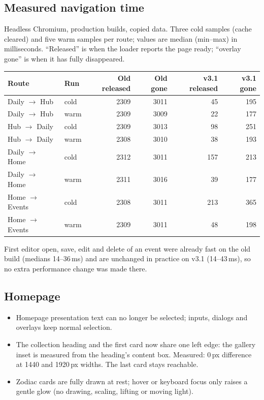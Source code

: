\documentclass[11pt,a4paper]{article}
\begin{document}
\subsection{Measured navigation time}
Headless Chromium, production builds, copied data. Three cold samples (cache cleared) and five warm samples per route; values are median (min--max) in milliseconds. ``Released'' is when the loader reports the page ready; ``overlay gone'' is when it has fully disappeared.

\begin{center}
\small
\begin{tabular}{@{}llrrrr@{}}
\toprule
Route & Run & Old released & Old gone & v3.1 released & v3.1 gone \\
\midrule
Daily $\to$ Hub & cold & 2309 & 3011 & 45 & 195 \\
Daily $\to$ Hub & warm & 2309 & 3009 & 22 & 177 \\
Hub $\to$ Daily & cold & 2309 & 3013 & 98 & 251 \\
Hub $\to$ Daily & warm & 2308 & 3010 & 38 & 193 \\
Daily $\to$ Home & cold & 2312 & 3011 & 157 & 213 \\
Daily $\to$ Home & warm & 2311 & 3016 & 39 & 177 \\
Home $\to$ Events & cold & 2308 & 3011 & 213 & 365 \\
Home $\to$ Events & warm & 2309 & 3011 & 48 & 198 \\
\bottomrule
\end{tabular}
\end{center}
First editor open, save, edit and delete of an event were already fast on the old build (medians 14--36\,ms) and are unchanged in practice on v3.1 (14--43\,ms), so no extra performance change was made there.

\subsection{Homepage}
\begin{itemize}
\item Homepage presentation text can no longer be selected; inputs, dialogs and overlays keep normal selection.
\item The collection heading and the first card now share one left edge: the gallery inset is measured from the heading's content box. Measured: 0\,px difference at 1440 and 1920\,px widths. The last card stays reachable.
\item Zodiac cards are fully drawn at rest; hover or keyboard focus only raises a gentle glow (no drawing, scaling, lifting or moving light).
\end{itemize}
\end{document}
